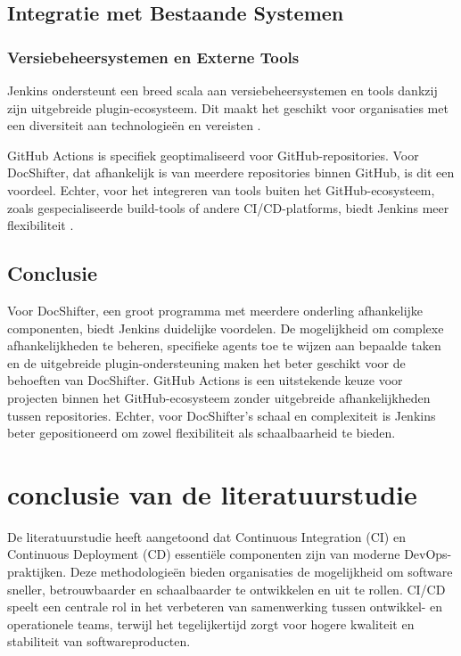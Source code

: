 \subsection{Integratie met Bestaande Systemen}

\subsubsection{Versiebeheersystemen en Externe Tools}

Jenkins ondersteunt een breed scala aan versiebeheersystemen en tools dankzij zijn uitgebreide plugin-ecosysteem. Dit maakt het geschikt voor organisaties met een diversiteit aan technologieën en vereisten \autocite{githubdocs2023actions}.

GitHub Actions is specifiek geoptimaliseerd voor GitHub-repositories. Voor DocShifter, dat afhankelijk is van meerdere repositories binnen GitHub, is dit een voordeel. Echter, voor het integreren van tools buiten het GitHub-ecosysteem, zoals gespecialiseerde build-tools of andere CI/CD-platforms, biedt Jenkins meer flexibiliteit \autocite{spacelift2023}.

\subsection{Conclusie}

Voor DocShifter, een groot programma met meerdere onderling afhankelijke componenten, biedt Jenkins duidelijke voordelen. De mogelijkheid om complexe afhankelijkheden te beheren, specifieke agents toe te wijzen aan bepaalde taken en de uitgebreide plugin-ondersteuning maken het beter geschikt voor de behoeften van DocShifter. GitHub Actions is een uitstekende keuze voor projecten binnen het GitHub-ecosysteem zonder uitgebreide afhankelijkheden tussen repositories. Echter, voor DocShifter’s schaal en complexiteit is Jenkins beter gepositioneerd om zowel flexibiliteit als schaalbaarheid te bieden.


\section{conclusie van de literatuurstudie}


De literatuurstudie heeft aangetoond dat Continuous Integration (CI) en Continuous Deployment (CD) essentiële componenten zijn van moderne DevOps-praktijken. Deze methodologieën bieden organisaties de mogelijkheid om software sneller, betrouwbaarder en schaalbaarder te ontwikkelen en uit te rollen. CI/CD speelt een centrale rol in het verbeteren van samenwerking tussen ontwikkel- en operationele teams, terwijl het tegelijkertijd zorgt voor hogere kwaliteit en stabiliteit van softwareproducten.

